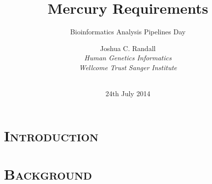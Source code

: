 \documentclass[xcolor=x11names,compress]{beamer}
\makeatletter
\renewcommand{\(}{\begin{columns}}
\renewcommand{\)}{\end{columns}}
\newcommand{\<}[1]{\begin{column}{#1}}
\renewcommand{\>}{\end{column}}
\newenvironment{backgroundblock}[2]{%
  \global\setbox\@backgroundblock=\vbox\bgroup%
    \unvbox\@backgroundblock%
    \vbox to0pt\bgroup\vskip#2\hbox to0pt\bgroup\hskip#1\relax%
}{\egroup\egroup\egroup}
\makeatother
\begin{document}
\section*{\scshape Introduction}
\begin{frame}
\title{Mercury Requirements}
\subtitle{Bioinformatics Analysis Pipelines Day}
\author{
	Joshua C. Randall \\
	{\it 
	Human Genetics Informatics \\
	Wellcome Trust Sanger Institute 
	}\\
}
\date{
	 \\
	\vspace{0.5cm}
	24th July 2014
}
\titlepage
\end{frame}


\newcommand{\pipesbackground}{
	\begin{backgroundblock}{0cm}{0cm}
		\vbox to \paperheight{\vfil\hbox to \paperwidth{\hfil
		\begin{overpic}[height=0.85\paperheight]{images/Jano_De_Cesare_-_Pipelines_-_by-nc-nd-2_0_-_flickr}
		\put(88,0.5){\textcolor{gray}{\fontsize{4}{6}\selectfont Photo: Jano De Cesare}}
		\end{overpic}
		\hfil\hskip 2mm}\vfil}
	\end{backgroundblock}
}



\section{\scshape Background}


\end{document}
